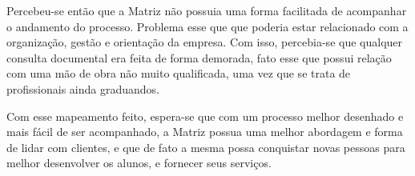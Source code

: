Percebeu-se então que a Matriz não possuia uma forma facilitada de acompanhar o andamento 
do processo. Problema esse que que poderia estar relacionado com a organização, gestão e 
orientação da empresa. Com isso, percebia-se que qualquer consulta documental era feita 
de forma demorada, fato esse que possui relação com uma mão de obra não muito qualificada, 
uma vez que se trata de profissionais ainda graduandos. 

Com esse mapeamento feito, espera-se que com um processo melhor desenhado e mais fácil de ser
acompanhado, a Matriz possua uma melhor abordagem e forma de lidar com clientes, e que de fato
a mesma possa conquistar novas pessoas para melhor desenvolver os alunos, e fornecer seus serviços.
